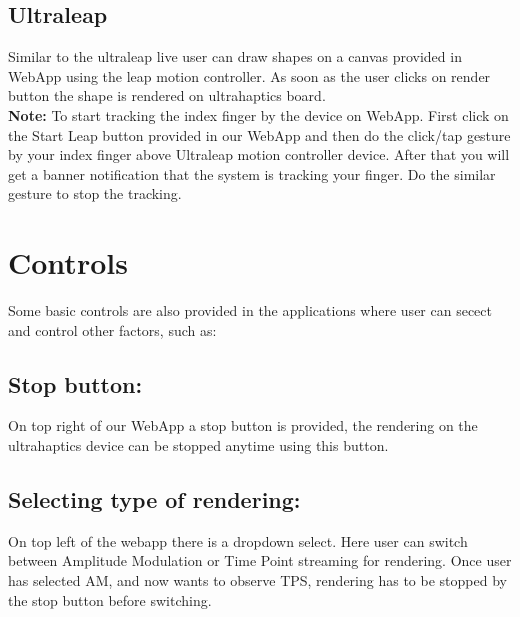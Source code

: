 \subsection*{Ultraleap }
Similar to the ultraleap live user can draw shapes on a canvas provided in WebApp
 using the leap motion controller. As soon as the user clicks on render button the 
 shape is rendered on ultrahaptics board. \\[4mm]


\textbf{Note:} To start tracking the index finger by the device on WebApp. First click on the Start Leap 
button provided in our WebApp and then do the click/tap gesture by your index finger above 
Ultraleap motion controller device. 
After that you will get a banner notification that the system is tracking your finger. 
Do the similar gesture to stop the tracking.\\


\section{Controls}
Some basic controls are also provided in the applications where user can secect and 
control other factors, such as:\\
\subsection*{Stop button:} 
On top right of our WebApp a stop button is provided, the rendering on the ultrahaptics 
device can be stopped anytime using this button.\\
\subsection*{Selecting type of rendering:}
On top left of the webapp there is a dropdown select. Here user can switch between
Amplitude Modulation or Time Point streaming for rendering. Once user has selected 
AM, and now wants to observe TPS, rendering has to be stopped by the stop button
before switching.

